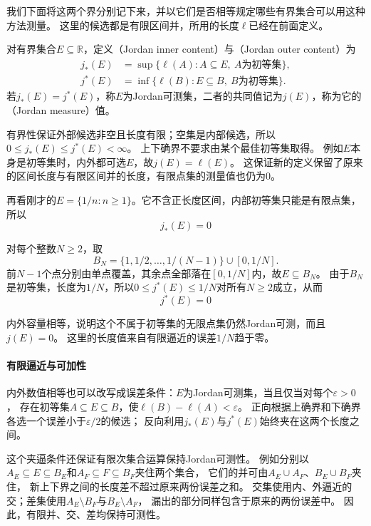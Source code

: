 我们下面将这两个界分别记下来，并以它们是否相等规定哪些有界集合可以用这种方法测量。
这里的候选都是有限区间并，所用的长度$\ell$已经在前面定义。
\begin{definition}[Jordan内容量与外容量]
\label{def:analysis-jordan-content}
对有界集合$E\subseteq\mathbb R$，定义（Jordan inner content）与（Jordan outer content）为
\[
 \begin{aligned}
 j_*(E)&=\sup\{\ell(A):A\subseteq E,\ A\text{为初等集}\},\\
 j^*(E)&=\inf\{\ell(B):E\subseteq B,\ B\text{为初等集}\}.
 \end{aligned}
\]
若$j_*(E)=j^*(E)$，称$E$为Jordan可测集，二者的共同值记为$j(E)$，称为它的（Jordan measure）值。
\end{definition}

有界性保证外部候选非空且长度有限；空集是内部候选，所以
$0\leq j_*(E)\leq j^*(E)<\infty$。
上下确界不要求由某个最佳初等集取得。
例如$E$本身是初等集时，内外都可选$E$，故$j(E)=\ell(E)$。
这保证新的定义保留了原来的区间长度与有限区间并的长度，有限点集的测量值也仍为$0$。

再看刚才的$E=\{1/n:n\geq1\}$。它不含正长度区间，内部初等集只能是有限点集，所以
\[
 j_*(E)=0
\]

对每个整数$N\geq2$，取
\[
 B_N=\{1,1/2,\ldots,1/(N-1)\}\cup[0,1/N].
\]
前$N-1$个点分别由单点覆盖，其余点全部落在$[0,1/N]$内，故$E\subseteq B_N$。
由于$B_N$是初等集，长度为$1/N$，所以$0\leq j^*(E)\leq1/N$对所有$N\geq2$成立，从而
\[
 j^*(E)=0
\]

内外容量相等，说明这个不属于初等集的无限点集仍然Jordan可测，而且$j(E)=0$。
这里的长度值来自有限逼近的误差$1/N$趋于零。

\paragraph{有限逼近与可加性}

内外数值相等也可以改写成误差条件：$E$为Jordan可测集，当且仅当对每个$\varepsilon>0$，
存在初等集$A\subseteq E\subseteq B$，使$\ell(B)-\ell(A)<\varepsilon$。
正向根据上确界和下确界各选一个误差小于$\varepsilon/2$的候选；
反向利用$j_*(E)$与$j^*(E)$始终夹在这两个长度之间。

这个夹逼条件还保证有限次集合运算保持Jordan可测性。
例如分别以$A_E\subseteq E\subseteq B_E$和$A_F\subseteq F\subseteq B_F$夹住两个集合，
它们的并可由$A_E\cup A_F$、$B_E\cup B_F$夹住，
新上下界之间的长度差不超过原来两份误差之和。
交集使用内、外逼近的交；差集使用$A_E\setminus B_F$与$B_E\setminus A_F$，
漏出的部分同样包含于原来的两份误差中。
因此，有限并、交、差均保持可测性。


